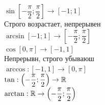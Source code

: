 $ \sin \left[ -\dfrac{\pi}{2}; \dfrac{\pi}{2} \right] \rightarrow [-1; 1] $\\
Строго возрастает, непрерывен\\
$ \arcsin [-1; 1] \rightarrow \left[ -\dfrac{\pi}{2}; \dfrac{\pi}{2} \right] $ \\
$ \cos [0, \pi] \rightarrow [-1, 1] $ \\
Непрерывн, строго убываюш \\
$ \arccos : [-1, 1] \rightarrow [0, \pi] $ \\
$ \tan :  \left( -\dfrac{\pi}{2}; \dfrac{\pi}{2} \right) \rightarrow \mathbb{R} $ \\
$ \arctan : \mathbb{R} \rightarrow  \left( -\dfrac{\pi}{2}; \dfrac{\pi}{2} \right) $ \\






